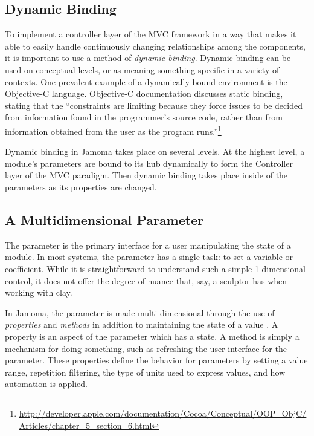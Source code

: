 \documentclass{article}
\begin{document}


\subsection{Dynamic Binding} %
\label{sec:dynamic_binding}

To implement a controller layer of the MVC framework in a way that makes it able to easily handle continuously changing relationships among the components, it is important to use a method of \emph{dynamic binding}. Dynamic binding can be used on conceptual levels, or as meaning something specific in a variety of contexts. One prevalent example of a dynamically bound environment is the Objective-C language. Objective-C documentation discusses static binding, stating that the ``constraints are limiting because they force issues to be decided from information found in the programmer’s source code, rather than from information obtained from the user as the program runs.''\footnote{\url{http://developer.apple.com/documentation/Cocoa/Conceptual/OOP_ObjC/Articles/chapter_5_section_6.html}}

Dynamic binding in Jamoma takes place on several levels.  At the highest level, a module's parameters are bound to its hub dynamically to form the Controller layer of the MVC paradigm.  Then dynamic binding takes place inside of the parameters as its properties are changed.


\subsection{A Multidimensional Parameter} %

The parameter is the primary interface for a user manipulating the state of a module. In most systems, the parameter has a single task: to set a variable or coefficient. While it is straightforward to understand such a simple 1-dimensional control, it does not offer the degree of nuance that, say, a sculptor has when working with clay.  

In Jamoma, the parameter is made multi-dimensional through the use of \emph{properties} and \emph{methods} in addition to maintaining the state of a value \cite{Place:2008}. A property is an aspect of the parameter which has a state. A method is simply a mechanism for doing something, such as refreshing the user interface for the parameter. These properties define the behavior for parameters by setting a value range, repetition filtering, the type of units used to express values, and how automation is applied.
\end{document}

